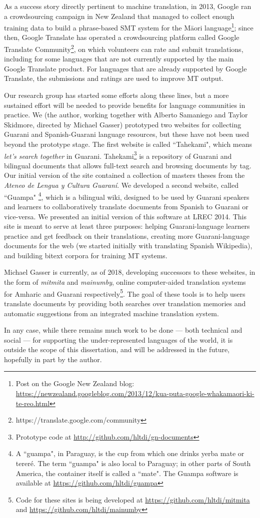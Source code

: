 As a success story directly pertinent to machine translation, in 2013, Google
ran a crowdsourcing campaign in New Zealand that managed to collect
enough training data to build a phrase-based SMT system for the Māori
language\footnote{Post on the Google New Zealand blog:
\url{https://newzealand.googleblog.com/2013/12/kua-puta-google-whakamaori-ki-te-reo.html}};
since then, Google Translate has operated a crowdsourcing platform called
Google Translate Community\footnote{https://translate.google.com/community},
on which volunteers can rate and submit translations, including for some
languages that are not currently supported by the main Google Translate
product. For languages that are already supported by Google Translate, the
submissions and ratings are used to improve MT output.

Our research group has started some efforts along these lines, but a more
sustained effort will be needed to provide benefits for language communities in
practice. We (the author, working together with Alberto Samaniego and Taylor
Skidmore, directed by Michael Gasser) prototyped two websites for collecting
Guarani and Spanish-Guarani language resources, but these have not been used
beyond the prototype stage.  The first website is called ``Tahekami", which
means \emph{let's search together} in Guarani. Tahekami\footnote{Prototype code
at \url{http://github.com/hltdi/gn-documents}} is a repository of Guarani and
bilingual documents that allows full-text search and browsing documents by tag.
Our initial version of the site contained a collection of masters theses from
the \emph{Ateneo de Lengua y Cultura Guaraní}.
We developed a second website, called ``Guampa" \footnote{A ``guampa", in
Paraguay, is the cup from which one drinks yerba mate or tereré. The term
``guampa" is also local to Paraguay; in other parts of South America, the
container itself is called a ``mate". The Guampa software is available at
\url{https://github.com/hltdi/guampa}}, which is a bilingual wiki, designed
to be used by Guarani speakers and learners to collaboratively translate
documents from Spanish to Guarani or vice-versa. We presented an initial version
of this software at LREC 2014\cite{RUDNICK14.151}. This site is meant to serve
at least three purposes: helping Guarani-language learners practice and get
feedback on their translations, creating more Guarani-language documents for
the web (we started initially with translating Spanish Wikipedia), and building
bitext corpora for training MT systems.

Michael Gasser is currently, as of 2018, developing successors to these
websites, in the form of \emph{mitmita} and \emph{mainumby}, online
computer-aided translation systems for Amharic and Guarani
respectively\footnote{Code for these sites is being developed at
\url{https://github.com/hltdi/mitmita} and
\url{https://github.com/hltdi/mainumby}}. The goal of these tools is to help
users translate documents by providing both searches over translation memories
and automatic suggestions from an integrated machine translation system.

In any case, while there remains much work to be done --- both technical and
social --- for supporting the under-represented languages of the world, it is
outside the scope of this dissertation, and will be addressed in the future,
hopefully in part by the author.
